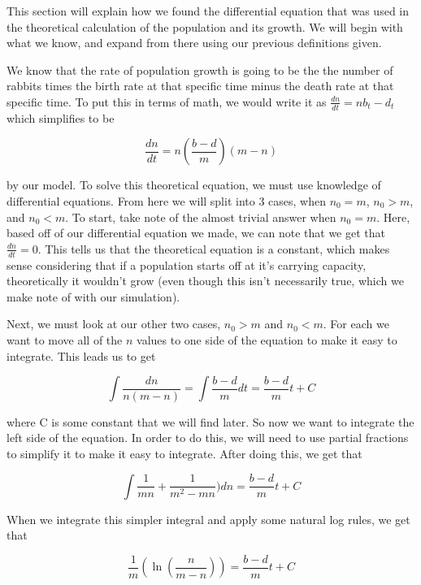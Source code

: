 \documentclass{article}\usepackage[]{graphicx}\usepackage[]{color}
\begin{document}
This section will explain how we found the differential equation that was used in the theoretical calculation of the population and its growth. We will begin with what we know, and expand from there using our previous definitions given.

We know that the rate of population growth is going to be the the number of rabbits times the birth rate at that specific time minus the death rate at that specific time. To put this in terms of math, we would write it as \(\frac{dn}{dt} = nb_t-d_t\) which simplifies to be 

\begin{equation}
\frac{dn}{dt} = n(\frac{b-d}{m})(m-n) 
\end{equation}

\noindent by our model. To solve this theoretical equation, we must use knowledge of differential equations. From here we will split into 3 cases, when \(n_0 =m\), \(n_0 > m\), and \(n_0 < m\). To start, take note of the almost trivial answer when \(n_0 = m\). Here, based off of our differential equation we made, we can note that we get that \(\frac{dn}{dt} = 0\). This tells us that the theoretical equation is a constant, which makes sense considering that if a population starts off at it's carrying capacity, theoretically it wouldn't grow (even though this isn't necessarily true, which we make note of with our simulation).

Next, we must look at our other two cases, \(n_0 > m\) and \(n_0 < m\). For each we want to move all of the \(n\) values to one side of the equation to make it easy to integrate. This leads us to get 

\begin{equation}
\int \frac{dn}{n(m-n)} = \int \frac{b-d}{m} dt = \frac{b-d}{m} t + C
\end{equation}

\noindent where C is some constant that we will find later. So now we want to integrate the left side of the equation. In order to do this, we will need to use partial fractions to simplify it to make it easy to integrate. After doing this, we get that 

\begin{equation}
\int\frac{1}{mn}+\frac{1}{m^2-mn})dn = \frac{b-d}{m} t + C
\end{equation}

\noindent When we integrate this simpler integral and apply some natural log rules, we get that 

\begin{equation}
\frac{1}{m}\left(\ln\left(\frac{n}{m-n}\right)\right) = \frac{b-d}{m} t + C
\end{equation}
\end{document}
